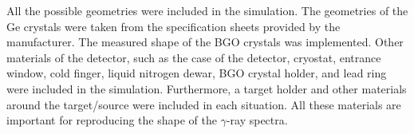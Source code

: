 All the possible geometries were included in the simulation.
The geometries of the Ge crystals were taken from the specification sheets provided by the manufacturer.
The measured shape of the BGO crystals was implemented.
Other materials of the detector, such as the case of the detector, cryostat, entrance window, cold finger, liquid nitrogen dewar, BGO crystal holder, and lead ring were included in the simulation.
Furthermore, a target holder and other materials around the target/source were included in each situation. %
All these materials are important for reproducing the shape of the $\gamma$-ray spectra.